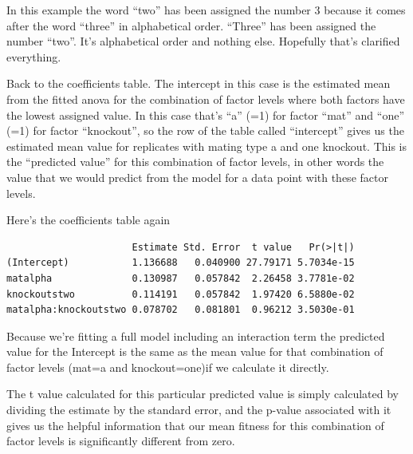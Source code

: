 \documentclass[
]{book}
\newenvironment{Shaded}{\begin{snugshade}}{\end{snugshade}}
\newcommand{\DecValTok}[1]{\textcolor[rgb]{0.00,0.00,0.81}{#1}}
\newcommand{\FloatTok}[1]{\textcolor[rgb]{0.00,0.00,0.81}{#1}}
\newcommand{\KeywordTok}[1]{\textcolor[rgb]{0.13,0.29,0.53}{\textbf{#1}}}
\newcommand{\NormalTok}[1]{#1}
\newcommand{\OperatorTok}[1]{\textcolor[rgb]{0.81,0.36,0.00}{\textbf{#1}}}
\newcommand{\StringTok}[1]{\textcolor[rgb]{0.31,0.60,0.02}{#1}}
\begin{document}
In this example the word ``two'' has been assigned the number 3 because it comes after the word ``three'' in alphabetical order. ``Three'' has been assigned the number ``two''. It's alphabetical order and nothing else. Hopefully that's clarified everything.

Back to the coefficients table. The intercept in this case is the estimated mean from the fitted anova for the combination of factor levels where both factors have the lowest assigned value. In this case that's ``a'' (=1) for factor ``mat'' and ``one'' (=1) for factor ``knockout'', so the row of the table called ``intercept'' gives us the estimated mean value for replicates with mating type a and one knockout. This is the ``predicted value'' for this combination of factor levels, in other words the value that we would predict from the model for a data point with these factor levels.

Here's the coefficients table again

\begin{verbatim}
                      Estimate Std. Error  t value   Pr(>|t|)
(Intercept)           1.136688   0.040900 27.79171 5.7034e-15
matalpha              0.130987   0.057842  2.26458 3.7781e-02
knockoutstwo          0.114191   0.057842  1.97420 6.5880e-02
matalpha:knockoutstwo 0.078702   0.081801  0.96212 3.5030e-01
\end{verbatim}

Because we're fitting a full model including an interaction term the predicted value for the Intercept is the same as the mean value for that combination of factor levels (mat=a and knockout=one)if we calculate it directly.

\begin{Shaded}
\end{Shaded}

The t value calculated for this particular predicted value is simply calculated by dividing the estimate by the standard error, and the p-value associated with it gives us the helpful information that our mean fitness for this combination of factor levels is significantly different from zero.
\end{document}
